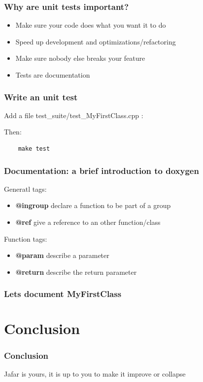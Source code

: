 \documentclass[pdf]{beamer}
\begin{document}
\begin{frame}
  \frametitle{Why are unit tests important?}
  \begin{itemize}
    \item<1-> Make sure your code does what you want it to do
    \item<2-> Speed up development and optimizations/refactoring
    \item<3-> Make sure nobody else breaks your feature
    \item<4-> Tests are documentation
  \end{itemize}
\end{frame}

\begin{frame}[fragile]
  \frametitle{Write an unit test}
  Add a file test\_suite/test\_MyFirstClass.cpp :
  
  Then:
  \begin{lstlisting}
    make test
  \end{lstlisting}
\end{frame}

\begin{frame}
  \frametitle{Documentation: a brief introduction to doxygen}
  Generatl tags:
  \begin{itemize}
    \item \textbf{@ingroup} declare a function to be part of a group
    \item \textbf{@ref} give a reference to an other function/class
  \end{itemize}

  Function tags:
  \begin{itemize}
    \item \textbf{@param} describe a parameter
    \item \textbf{@return} describe the return parameter
  \end{itemize}

\end{frame}

\begin{frame}[fragile]
  \frametitle{Lets document MyFirstClass}
  
\end{frame}

\section{Conclusion}
\begin{frame}
\frametitle{Conclusion}
\Huge{Jafar is yours, it is up to you to make it improve or collapse}
\end{frame}
\end{document}
